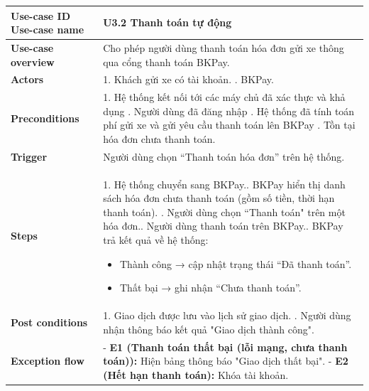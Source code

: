 \vspace{0.5cm}

\noindent
\begin{tabularx}{\textwidth}{|>{\raggedright\arraybackslash}p{4cm}|X|}
\hline
\textbf{Use-case ID} \newline \textbf{Use-case name} & U3.2 \newline \textbf{Thanh toán tự động} \\ \hline
\textbf{Use-case overview} & Cho phép người dùng thanh toán hóa đơn gửi xe thông qua cổng thanh toán BKPay. \\ \hline
\textbf{Actors} & 1. Khách gửi xe có tài khoản. \newline 2. BKPay. \\ \hline
\textbf{Preconditions} & 
1. Hệ thống kết nối tới các máy chủ đã xác thực và khả dụng \newline
2. Người dùng đã đăng nhập \newline
3. Hệ thống đã tính toán phí gửi xe và gửi yêu cầu thanh toán lên BKPay \newline
4. Tồn tại hóa đơn chưa thanh toán. \\ \hline
\textbf{Trigger} & Người dùng chọn “Thanh toán hóa đơn” trên hệ thống. \\ \hline
\textbf{Steps} & 
1. Hệ thống chuyển sang BKPay.\newline
2. BKPay hiển thị danh sách hóa đơn chưa thanh toán (gồm số tiền, thời hạn thanh toán). \newline
3. Người dùng chọn “Thanh toán" trên một hóa đơn.\newline
4. Người dùng thanh toán trên BKPay.\newline
5. BKPay trả kết quả về hệ thống: 
\vspace*{-10pt}
    \begin{itemize}
        \item Thành công → cập nhật trạng thái “Đã thanh toán”.
        \vspace*{-10pt}
        \item Thất bại → ghi nhận “Chưa thanh toán”. 
    \end{itemize}
\vspace*{-10pt}
\\ \hline
\textbf{Post conditions} &  
                            1. Giao dịch được lưu vào lịch sử giao dịch. \newline
                            2. Người dùng nhận thông báo kết quả "Giao dịch thành công".
 \\ \hline
\textbf{Exception flow} & 
- \textbf{E1 (Thanh toán thất bại (lỗi mạng, chưa thanh toán)):} Hiện bảng thông báo "Giao dịch thất bại".\newline 
- \textbf{E2 (Hết hạn thanh toán):} Khóa tài khoản. \\ \hline
\end{tabularx}

